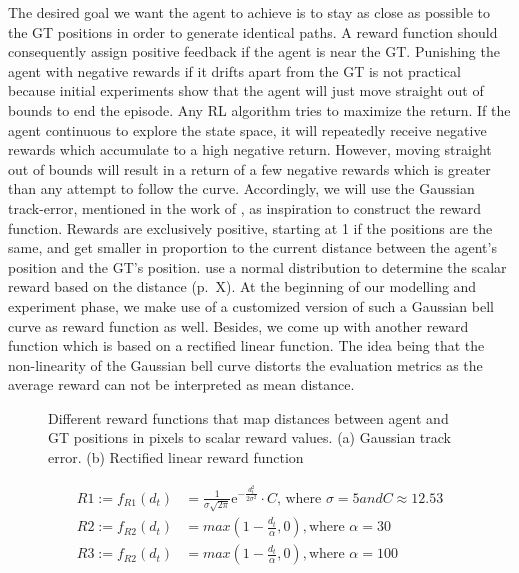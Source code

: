 The desired goal we want the agent to achieve is to stay as close as possible to the GT positions in order to generate identical paths. A reward function should consequently assign positive feedback if the agent is near the GT. Punishing the agent with negative rewards if it drifts apart from the GT is not practical because initial experiments show that the agent will just move straight out of bounds to end the episode. Any RL algorithm tries to maximize the return. If the agent continuous to explore the state space, it will repeatedly receive negative rewards which accumulate to a high negative return. However, moving straight out of bounds will result in a return of a few negative rewards which is greater than any attempt to follow the curve. Accordingly, we will use the Gaussian track-error, mentioned in the work of \cite{martinsen2018curved}, as inspiration to construct the reward function. Rewards are exclusively positive, starting at 1 if the positions are the same, and get smaller in proportion to the current distance between the agent's position and the GT's position. \cite{martinsen2018curved} use a normal distribution to determine the scalar reward based on the distance (p.~X). At the beginning of our modelling and experiment phase, we make use of a customized version of such a Gaussian bell curve as reward function as well. Besides, we come up with another reward function which is based on a rectified linear function. The idea being that the non-linearity of the Gaussian bell curve distorts the evaluation metrics as the average reward can not be interpreted as mean distance. 

\begin{figure}[H]
    \centering
    \begin{subfigure}[b]{0.49\textwidth}
        \centering
        
        \caption{}
        \label{fig:reward1}
    \end{subfigure}
    \hfill
    \begin{subfigure}[b]{0.49\textwidth}
        \centering
        
        \caption{}
        \label{fig:reward2}
    \end{subfigure}
    \caption{Different reward functions that map distances between agent and GT positions in pixels to scalar reward values. (a) Gaussian track error. (b) Rectified linear reward function}
    \label{fig:rewardFunctions}
\end{figure}


\begin{equation}
\begin{aligned}
    R1 := f_{R1}(d_t) &= \frac{1}{\sigma \sqrt{2\pi}} \mathrm{e}^{-\frac{d_t^2}{2\sigma^2}} \cdot C \text{, where $\sigma = 5 and C \approx 12.53$}
\\
R2 := f_{R2}(d_t) &= max(1 - \frac{d_t}{\alpha}, 0) , \text{where $\alpha = 30$}
\\
R3 := f_{R2}(d_t) &= max(1 - \frac{d_t}{\alpha}, 0) , \text{where $\alpha = 100$}
    \end{aligned}
\end{equation}\label{eq:rewardFunctions}

